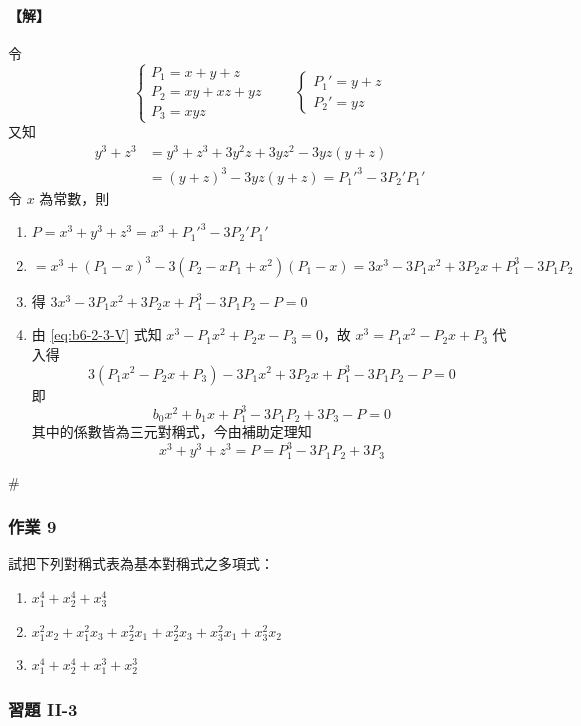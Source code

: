 \paragraph{【解】}
令
\[ \begin{cases}
P_1 = x+y+z \\
P_2 = xy+xz+yz \\
P_3 = xyz
\end{cases} \qquad \begin{cases}
P_1' = y+z \\
P_2' = yz
\end{cases} \]
又知
\begin{align*}
y^3+z^3 &= y^3+z^3+3y^2z+3yz^2 - 3yz(y+z) \\
&= (y+z)^3 - 3yz(y+z) = P_1'^3 - 3P_2'P_1'
\end{align*}
令 $x$ 為常數，則
\begin{enumerate}[label=(\Roman*), leftmargin=2em]
  \item $P = x^3+y^3+z^3 = x^3 + P_1'^3 - 3P_2'P_1'$
  \item $= x^3 + (P_1-x)^3 - 3(P_2 - x P_1 + x^2)(P_1-x) = 3x^3 - 3P_1 x^2 + 3P_2 x + P_1^3 - 3P_1 P_2$
  \item 得 $3x^3 - 3P_1 x^2 + 3P_2 x + P_1^3 - 3P_1 P_2 - P = 0$
  \item 由 \eqref{eq:b6-2-3-V} 式知 $x^3 - P_1 x^2 + P_2 x - P_3 = 0$，故 $x^3 = P_1 x^2 - P_2 x + P_3$ 代入得
  \[ 3(P_1 x^2 - P_2 x + P_3) - 3P_1 x^2 + 3P_2 x + P_1^3 - 3P_1 P_2 - P = 0 \]
  即
  \[ b_0 x^2 + b_1 x + P_1^3 - 3P_1 P_2 + 3P_3 - P = 0 \]
  其中的係數皆為三元對稱式，今由補助定理知
  \[ x^3+y^3+z^3 = P = P_1^3 - 3P_1 P_2 + 3P_3 \]
\end{enumerate}
\hfill$\#$

\subsubsection*{作業 9}\label{hw:b6-2-9}
試把下列對稱式表為基本對稱式之多項式：
\begin{enumerate}[label=(\roman*)]
  \item $x_1^4 + x_2^4 + x_3^4$
  \item $x_1^2 x_2 + x_1^2 x_3 + x_2^2 x_1 + x_2^2 x_3 + x_3^2 x_1 + x_3^2 x_2$
  \item $x_1^4 + x_2^4 + x_1^3 + x_2^3$
\end{enumerate}

\subsubsection*{習題 II-3}\label{sec:b6-ex2-3}

